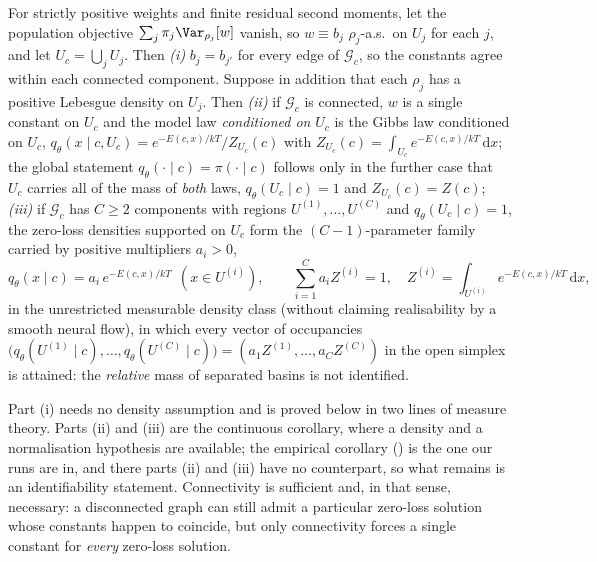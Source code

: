 \begin{theorem}
\label{thm:l2g}
For strictly positive weights and finite residual second moments, let the population objective $\sum_j \pi_j \Var_{\rho_j}[w]$ vanish, so $w \equiv b_j$
$\rho_j$-a.s.\ on $U_j$ for each $j$, and let $U_c = \bigcup_j U_j$. Then \emph{(i)}
$b_j = b_{j'}$ for every edge of $\mathcal{G}_c$, so the constants agree within each connected
component. Suppose in addition that each $\rho_j$ has a positive Lebesgue density on $U_j$. Then
\emph{(ii)} if $\mathcal{G}_c$ is connected, $w$ is a single constant on $U_c$ and the model law
\emph{conditioned on} $U_c$ is the Gibbs law conditioned on $U_c$,
$q_\theta(x \mid c, U_c) = e^{-E(c,x)/kT}/Z_{U_c}(c)$ with
$Z_{U_c}(c) = \int_{U_c} e^{-E(c,x)/kT}\,\mathrm{d}x$; the global statement
$q_\theta(\cdot \mid c) = \pi(\cdot \mid c)$ follows only in the further case that $U_c$ carries
all of the mass of \emph{both} laws, $q_\theta(U_c \mid c) = 1$ and $Z_{U_c}(c) = Z(c)$;
\emph{(iii)} if $\mathcal{G}_c$ has $C \ge 2$ components with regions $U^{(1)},\dots,U^{(C)}$ and
$q_\theta(U_c \mid c) = 1$, the zero-loss densities supported on $U_c$ form the
$(C-1)$-parameter family carried by positive multipliers $a_i > 0$,
\begin{equation}
  q_\theta(x \mid c) = a_i\,e^{-E(c,x)/kT} \ \ (x \in U^{(i)}),
  \qquad \textstyle\sum_{i=1}^{C} a_i Z^{(i)} = 1, \quad
  Z^{(i)} = \int_{U^{(i)}} e^{-E(c,x)/kT}\,\mathrm{d}x ,
  \label{eq:l2g}
\end{equation}
in the unrestricted measurable density class (without claiming realisability by a smooth neural flow), in which every vector of occupancies
$\bigl(q_\theta(U^{(1)} \mid c),\dots,q_\theta(U^{(C)} \mid c)\bigr)
 = (a_1 Z^{(1)},\dots,a_C Z^{(C)})$
in the open simplex is attained: the \emph{relative} mass of separated basins is not identified.
\end{theorem}

Part (i) needs no density assumption and is proved below in two lines of measure
theory. Parts (ii) and (iii) are the continuous corollary, where a density and a
normalisation hypothesis are available; the empirical corollary
() is the one our runs are in, and there parts (ii) and (iii)
have no counterpart, so what remains is an identifiability statement. Connectivity
is sufficient and, in that sense, necessary: a disconnected graph can still admit a
particular zero-loss solution whose constants happen to coincide, but only
connectivity forces a single constant for \emph{every} zero-loss solution.

